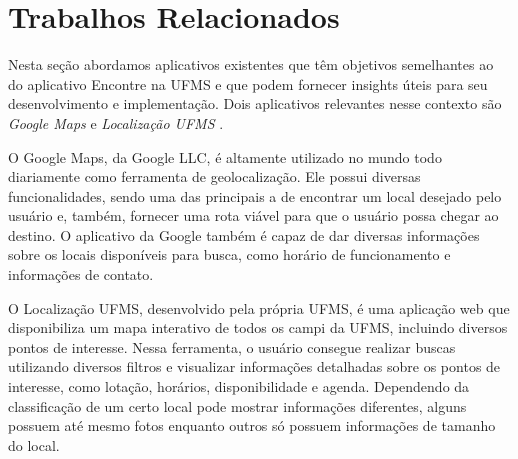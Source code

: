 \section{Trabalhos Relacionados}

Nesta seção abordamos aplicativos existentes que têm objetivos semelhantes ao do aplicativo Encontre na UFMS e que podem fornecer insights úteis para seu desenvolvimento e implementação. Dois aplicativos relevantes nesse contexto são \textit{Google Maps} \cite{maps2005} e \textit{Localização UFMS} \cite{localizacaoufms}.

O Google Maps, da Google LLC, é altamente utilizado no mundo todo diariamente como ferramenta de geolocalização. Ele possui diversas funcionalidades, sendo uma das principais a de encontrar um local desejado pelo usuário e, também, fornecer uma rota viável para que o usuário possa chegar ao destino. O aplicativo da Google também é capaz de dar diversas informações sobre os locais disponíveis para busca, como horário de funcionamento e informações de contato.

O Localização UFMS, desenvolvido pela própria UFMS, é uma aplicação web que disponibiliza um mapa interativo de todos os campi da UFMS, incluindo diversos pontos de interesse. Nessa ferramenta, o usuário consegue realizar buscas utilizando diversos filtros e visualizar informações detalhadas sobre os pontos de interesse, como lotação, horários, disponibilidade e agenda. Dependendo da classificação de um certo local pode mostrar informações diferentes, alguns possuem até mesmo fotos enquanto outros só possuem informações de tamanho do local. 